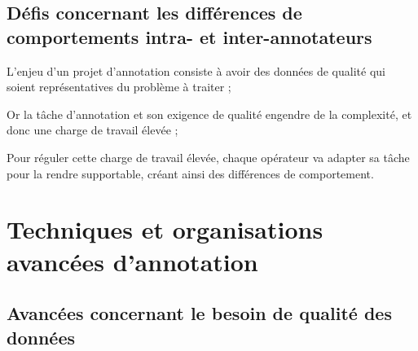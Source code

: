 		
		\subsection{Défis concernant les différences de comportements intra- et inter-annotateurs}
		\label{section:2.3.3-DEFIS-ANNOTATION-ASPECT-HUMAIN}
		
		
		\begin{leftBarSummary}
			\begin{todolist}
				\item[\itemok] L'enjeu d'un projet d'annotation consiste à avoir des données de qualité qui soient représentatives du problème à traiter ;
				\item[\itemok] Or la tâche d'annotation et son exigence de qualité engendre de la complexité, et donc une charge de travail élevée ;
				\item[\itemok] Pour réguler cette charge de travail élevée, chaque opérateur va adapter sa tâche pour la rendre supportable, créant ainsi des différences de comportement.
			\end{todolist}
		\end{leftBarSummary}
	
	
    \section{Techniques et organisations avancées d'annotation}
	\label{section:2.4-AVANCEES-ANNOTATION}
		
		
		\subsection{Avancées concernant le besoin de qualité des données}
		\label{section:2.4.1-AVANCEES-ANNOTATION-ASPECT-DONNEES}
		
